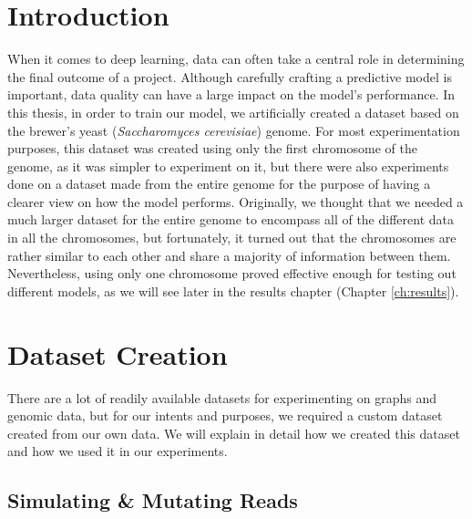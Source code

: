 \documentclass[times, utf8, diplomski, english]{fer_eng}
\begin{document}
\section{Introduction}
\label{sec:introduction}

When it comes to deep learning, data can often take a central role in determining the final outcome of a project. Although carefully crafting a predictive model is important, data quality can have a large impact on the model's performance. In this thesis, in order to train our model, we artificially created a dataset based on the brewer's yeast (\textit{Saccharomyces cerevisiae}) genome. For most experimentation purposes, this dataset was created using only the first chromosome of the genome, as it was simpler to experiment on it, but there were also experiments done on a dataset made from the entire genome for the purpose of having a clearer view on how the model performs. Originally, we thought that we needed a much larger dataset for the entire genome to encompass all of the different data in all the chromosomes, but fortunately, it turned out that the chromosomes are rather similar to each other and share a majority of information between them. Nevertheless, using only one chromosome proved effective enough for testing out different models, as we will see later in the results chapter (Chapter \ref{ch:results}).

\section{Dataset Creation}
\label{sec:dataset creation}

There are a lot of readily available datasets for experimenting on graphs and genomic data, but for our intents and purposes, we required a custom dataset created from our own data. We will explain in detail how we created this dataset and how we used it in our experiments.

\subsection{Simulating \& Mutating Reads}
\end{document}
